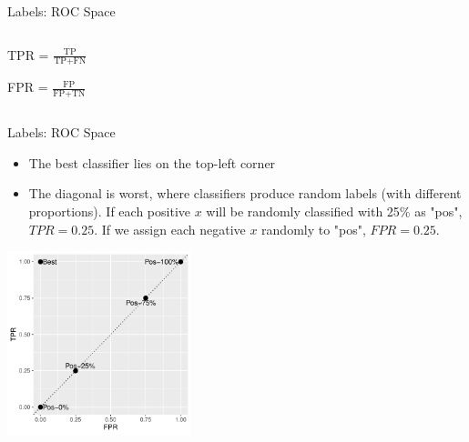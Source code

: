 \documentclass[11pt,compress,t,notes=noshow, xcolor=table]{beamer}
\newenvironment{knitrout}{}{} %
\begin{document}
\begin{vbframe}{Labels: ROC Space}
\begin{columns}
\begin{column}{0.5\textwidth}
\begin{center}
\lz\lz

TPR = $\frac{\text{TP}}{\text{TP} + \text{FN}}$

\lz

FPR = $\frac{\text{FP}}{\text{FP} + \text{TN}}$
\end{center}


\end{column}
\end{columns}

\end{vbframe}


\begin{vbframe}{Labels: ROC Space}
  \begin{itemize}
  \item The best classifier lies on the top-left corner
  \item The diagonal is worst, where classifiers produce random labels (with different proportions). If each positive $x$ will be randomly classified with 25\% as "pos", $TPR = 0.25$. If we assign each negative $x$ randomly to "pos", $FPR = 0.25$.
\end{itemize}

\lz
\begin{knitrout}\scriptsize
{}\color{fgcolor}

{\centering \includegraphics[width=0.4\textwidth]{figure/eval_mclass_roc_sp_2} 

}



\end{knitrout}
\end{vbframe}
\end{document}
